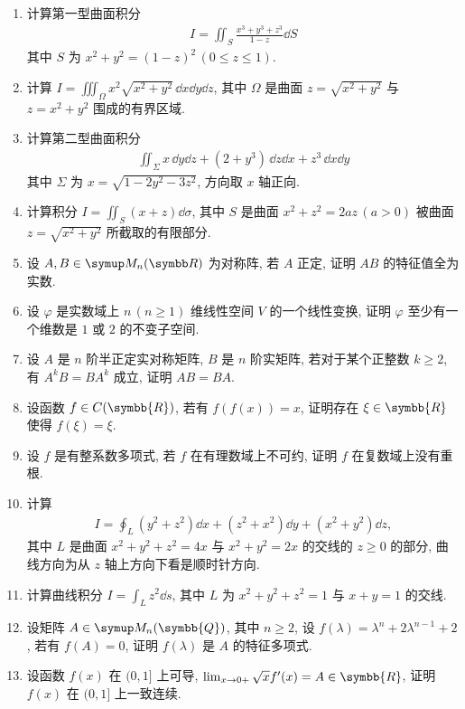 \documentclass{ctexart}
\let\ge\geqslant
\let\le\leqslant
\newcommand{\limit}[2]{\lim_{#1 \to #2}}
\newcommand{\R}{\ensuremath{\symbb{R}}}
\newcommand{\Q}{\ensuremath{\symbb{Q}}}
\begin{document}
\begin{enumerate}[resume=exer]
        \item 计算第一型曲面积分
        \begin{align*}
            I = \iint_{S} \frac{x^{3} + y^{3} + z^{3}}{1-z} \dd{S}
        \end{align*}
        其中 $ S $ 为 $ x^{2} + y^{2} = (1-z)^{2}\,(0 \le z \le 1) $. 
        \item 计算 $ I = \iiint_{\Omega} x^{2}\sqrt{x^{2} + y^{2}}\,\dd x\dd y\dd z $, 其中 $ \Omega $ 是曲面 $ z = \sqrt{x^{2} + y^{2}} $ 与 $ z = x^{2} + y^{2} $ 围成的有界区域.
        \item 计算第二型曲面积分
        \begin{align*}
            \iint_{\Sigma} x\,\dd y\dd z + (2 + y^{3})\,\dd z\dd x + z^{3}\,\dd x\dd y
        \end{align*}
        其中 $ \Sigma $ 为 $ x = \sqrt{1 - 2y^{2} - 3z^{2}} $, 方向取 $ x $ 轴正向.
        \item 计算积分 $ I = \iint_{S} (x + z) \dd{\sigma} $, 其中 $ S $ 是曲面 $ x^{2} + z^{2} = 2az\,(a > 0) $ 被曲面 $ z = \sqrt{x^{2} + y^{2}} $ 所截取的有限部分.
        \item 设 $ A, B \in \MM $ 为对称阵, 若 $ A $ 正定, 证明 $ AB $ 的特征值全为实数.
        \item 设 $ \varphi $ 是实数域上 $ n\,(n\ge 1) $ 维线性空间 $ V $ 的一个线性变换, 证明 $ \varphi $ 至少有一个维数是 $ 1 $ 或 $ 2 $ 的不变子空间.
        \item 设 $ A $ 是 $ n $ 阶半正定实对称矩阵, $ B $ 是 $ n $ 阶实矩阵, 若对于某个正整数 $ k \ge 2 $, 有 $ A^{k}B = BA^{k} $ 成立, 证明 $ AB = BA $. 
        \item 设函数 $ f \in C(\R) $, 若有 $ f(f(x)) = x $, 证明存在 $ \xi\in \R $ 使得 $ f(\xi) = \xi $.
        \item 设 $ f $ 是有整系数多项式, 若 $ f $ 在有理数域上不可约, 证明 $ f $ 在复数域上没有重根. 
        \item 计算 
        \begin{align*}
            I = \oint_{L} (y^{2} + z^{2}) \dd{x} + (z^{2} + x^{2}) \dd{y} + (x^{2} + y^{2}) \dd{z},
        \end{align*}
        其中 $ L $ 是曲面 $ x^{2} + y^{2} + z^{2} = 4x $ 与 $ x^{2} + y^{2} = 2x $ 的交线的 $ z \ge 0 $ 的部分, 曲线方向为从 $ z $ 轴上方向下看是顺时针方向.
        \item 计算曲线积分 $ I = \int_{L} z^{2} \dd{s} $, 其中 $ L $ 为 $ x^{2} + y^{2} + z^{2} = 1 $ 与 $ x + y = 1 $ 的交线.
        \item 设矩阵 $ A \in \MM[\Q] $, 其中 $ n\ge 2 $, 设 $ f(\lambda) = \lambda^{n} + 2\lambda^{n-1} + 2 $, 若有 $ f(A) = 0 $, 证明 $ f(\lambda) $ 是 $ A $ 的特征多项式.
        \item 设函数 $ f(x) $ 在 $ (0, 1] $ 上可导, $ \limit{x}{0+} \sqrt{x}f'(x) = A\in \R $, 证明 $ f(x) $ 在 $ (0, 1] $ 上一致连续.
    \end{enumerate}
\end{document}
